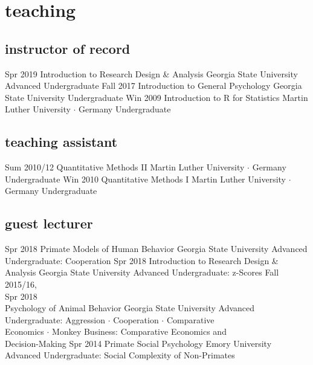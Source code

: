 \documentclass[]{friggeri-cv}
\begin{document}

\section{teaching}

\subsection{instructor of record}

\begin{entrylist}
  \entry
    {Spr 2019}
    {Introduction to Research Design \& Analysis}
    {Georgia State University}
    {Advanced Undergraduate}
  \entry
    {Fall 2017}
    {Introduction to General Psychology}
    {Georgia State University}
    {Undergraduate}
  \entry
    {Win 2009}
    {Introduction to R for Statistics}
    {Martin Luther University $\cdot$ Germany}
    {Undergraduate}
\end{entrylist}

\subsection{teaching assistant}

\begin{entrylist}
  \entry
    {Sum 2010/12}
    {Quantitative Methods II}
    {Martin Luther University $\cdot$ Germany}
    {Undergraduate}
  \entry
    {Win 2010}
    {Quantitative Methods I}
    {Martin Luther University $\cdot$ Germany}
    {Undergraduate}
\end{entrylist}

\subsection{guest lecturer}

\begin{entrylist}
  \entry
    {Spr 2018}
    {Primate Models of Human Behavior}
    {Georgia State University}
    {Advanced Undergraduate: Cooperation}
  \entry
    {Spr 2018}
    {Introduction to Research Design \& Analysis}
    {Georgia State University}
    {Advanced Undergraduate: z-Scores}
  \entry
    {Fall 2015/16,\\Spr 2018\\[-.85cm]}
    {Psychology of Animal Behavior}
    {Georgia State University}
    {Advanced Undergraduate: Aggression $\cdot$ Cooperation $\cdot$ Comparative \\
    Economics $\cdot$ Monkey Business: Comparative Economics and \\
    Decision-Making}
  \entry
    {Spr 2014}
    {Primate Social Psychology}
    {Emory University}
    {Advanced Undergraduate: Social Complexity of Non-Primates}
\end{entrylist}
\end{document}
